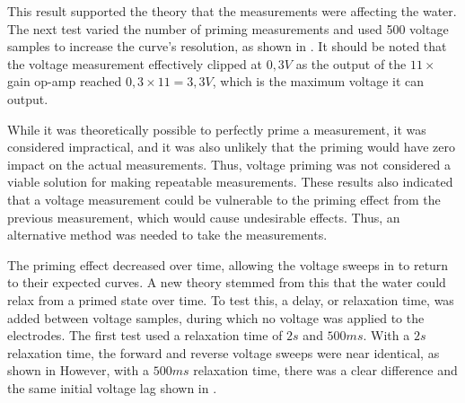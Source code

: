 This result supported the theory that the measurements were affecting the water.
The next test varied the number of priming measurements and used 500 voltage samples to increase the curve's resolution, as shown in .
It should be noted that the voltage measurement effectively clipped at $0,3V$ as the output of the $11\times$ gain op-amp reached $0,3\times 11 = 3,3V$, which is the maximum voltage it can output.

While it was theoretically possible to perfectly prime a measurement, it was considered impractical, and it was also unlikely that the priming would have zero impact on the actual measurements.
Thus, voltage priming was not considered a viable solution for making repeatable measurements.
These results also indicated that a voltage measurement could be vulnerable to the priming effect from the previous measurement, which would cause undesirable effects.
Thus, an alternative method was needed to take the measurements.

The priming effect decreased over time, allowing the voltage sweeps in  to return to their expected curves.
A new theory stemmed from this that the water could relax from a primed state over time.
To test this, a delay, or relaxation time, was added between voltage samples, during which no voltage was applied to the electrodes.
The first test used a relaxation time of $2s$ and $500ms$.
With a $2s$ relaxation time, the forward and reverse voltage sweeps were near identical, as shown in 
However, with a $500ms$ relaxation time, there was a clear difference and the same initial voltage lag shown in .

